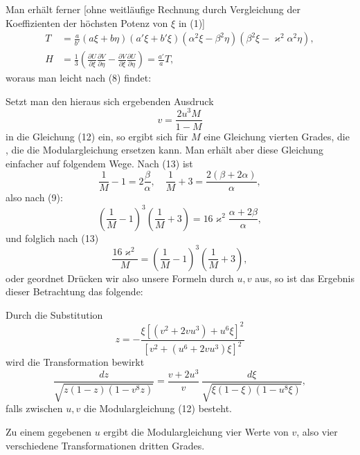 Man erhält ferner [ohne weitläufige Rechnung durch Vergleichung der Koeffizienten der höchsten Potenz von $\xi$ in (1)]
\[
\begin{aligned}
T &= \frac{a}{b'}(a\xi+b\eta)(a'\xi+b'\xi)(\alpha^2\xi-\beta^2\eta)(\beta^2\xi-\varkappa^2\alpha^2\eta), %
\\
H &= \frac{1}{3}\left(\frac{\partial U}{\partial \xi}\frac{\partial V}{\partial \eta}-\frac{\partial V}{\partial \xi}\frac{\partial U}{\partial \eta}\right) = \frac{a'}{a}T,
\end{aligned}
\]
woraus man leicht nach (8) findet:

Setzt man den hieraus sich ergebenden Ausdruck
\[
v = \frac{2u^3M}{1-M}
\]
in die Gleichung (12) ein, so ergibt sich für $M$ eine Gleichung vierten Grades, die , die die Modulargleichung ersetzen kann. Man erhält aber diese Gleichung einfacher auf folgendem Wege. Nach (13) ist
\[
\frac{1}{M}-1 = 2\frac{\beta}{\alpha}, \quad \frac{1}{M}+3 = \frac{2(\beta+2\alpha)}{\alpha},
\]
also nach (9):
\[
\left(\frac{1}{M}-1\right)^3\left(\frac{1}{M}+3\right) = 16\varkappa^2\frac{\alpha+2\beta}{\alpha},
\]
und folglich nach (13)
\[
\frac{16\varkappa^2}{M} = \left(\frac{1}{M}-1\right)^3\left(\frac{1}{M}+3\right),
\]
oder geordnet
Drücken wir also unsere Formeln durch $u, v$ aus, so ist das Ergebnis dieser Betrachtung das folgende:

Durch die Substitution
\[
z = -\frac{\xi[(v^2+2vu^3)+u^6\xi]^2}{[v^2+(u^6+2vu^3)\xi]^2}
\]
wird die Transformation bewirkt
\[
\frac{dz}{\sqrt{z(1-z)(1-v^8z)}} = \frac{v+2u^3}{v}\,\frac{d\xi}{\sqrt{\xi(1-\xi)(1-u^8\xi)}},
\]
falls zwischen $u, v$ die Modulargleichung (12) besteht.

Zu einem gegebenen $u$ ergibt die Modulargleichung vier Werte von $v$, also vier verschiedene Transformationen dritten Grades.
